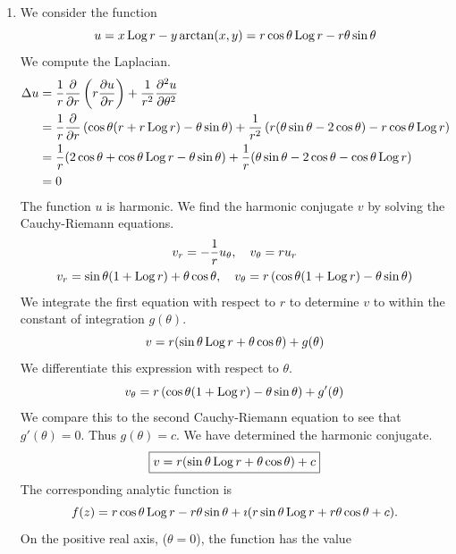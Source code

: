 {%
\begin{Solution}
  \label{solution xlogr yarctanxy}
  \begin{enumerate}
  \item
    We consider the function
    \[
    u = x \mathop{\mathrm{Log}}\nolimits r - y \arctan(x, y) = r \cos \theta \mathop{\mathrm{Log}}\nolimits r - r \theta \sin \theta 
    \]
    We compute the Laplacian.
    \begin{align*}
      \Delta u &= \frac{1}{r} \frac{\partial}{\partial r} \left( r \frac{\partial u}{\partial r} \right)
      + \frac{1}{r^2} \frac{\partial^2 u}{\partial \theta^2} 
      \\
      &= \frac{1}{r} \frac{\partial}{\partial r} \left( \cos \theta (r + r \mathop{\mathrm{Log}}\nolimits r) 
        - \theta \sin \theta \right)
      + \frac{1}{r^2} \left( r (\theta \sin \theta - 2 \cos \theta) 
        - r \cos \theta \mathop{\mathrm{Log}}\nolimits r \right) 
      \\
      &= \frac{1}{r} ( 2 \cos \theta + \cos \theta \mathop{\mathrm{Log}}\nolimits r - \theta \sin \theta )
      + \frac{1}{r} ( \theta \sin \theta - 2 \cos \theta - \cos \theta \mathop{\mathrm{Log}}\nolimits r)  
      \\
      &= 0
    \end{align*}
    The function $u$ is harmonic.  We find the harmonic conjugate $v$ by 
    solving the Cauchy-Riemann equations.
    \begin{gather*}
      v_r = - \frac{1}{r} u_\theta, \quad v_\theta = r u_r 
      \\
      v_r = \sin \theta (1 + \mathop{\mathrm{Log}}\nolimits r) + \theta \cos \theta, \quad
      v_\theta = r \left( \cos \theta  (1 + \mathop{\mathrm{Log}}\nolimits r) - \theta \sin \theta \right)
    \end{gather*}
    We integrate the first equation with respect to $r$ to determine $v$ to 
    within the constant of integration $g(\theta)$.
    \[
    v = r ( \sin \theta \mathop{\mathrm{Log}}\nolimits r + \theta \cos \theta ) + g(\theta)
    \]
    We differentiate this expression with respect to $\theta$.
    \[
    v_\theta = r \left( \cos \theta (1 + \mathop{\mathrm{Log}}\nolimits r) - \theta \sin \theta \right) + g'(\theta)
    \]
    We compare this to the second Cauchy-Riemann equation to see that
    $g'(\theta) = 0$.  Thus $g(\theta) = c$.  We have determined the harmonic conjugate.
    \[
    \boxed{
      v = r ( \sin \theta \mathop{\mathrm{Log}}\nolimits r + \theta \cos \theta ) + c
      }
    \]
    The corresponding analytic function is 
    \[
    f(z) = r \cos \theta \mathop{\mathrm{Log}}\nolimits r - r \theta \sin \theta + \imath ( r \sin \theta \mathop{\mathrm{Log}}\nolimits r 
    + r \theta \cos \theta + c ).
    \]
    On the positive real axis, ($\theta = 0$), the function has the value

\end{enumerate}
\end{Solution}}
